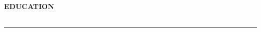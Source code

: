 \begin{center}
\textbf{EDUCATION}
\end{center}

\vspace{0.3cm}

\begin{longtable}{p{}p{}}


\end{longtable}

\vspace{0.5cm}
\rule{\textwidth}{0.5pt}
\vspace{0.5cm} 